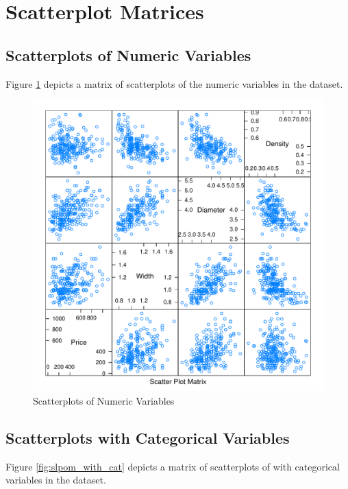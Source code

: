\documentclass[11pt]{book}
\begin{document}
\clearpage
\pagebreak
\section*{Scatterplot Matrices}


\subsection*{Scatterplots of Numeric Variables}

Figure \ref{fig:slpom_num_only} depicts a matrix of scatterplots
of the numeric variables in the dataset.

\begin{figure}[h!]
  \centering
  \includegraphics[scale = 0.5, keepaspectratio=true]{../Figures/slpom_num_only}
  \caption{Scatterplots of Numeric Variables} \label{fig:slpom_num_only}
\end{figure}


\pagebreak
\subsection*{Scatterplots with Categorical Variables}

Figure \ref{fig:slpom_with_cat} depicts a matrix of scatterplots
of with categorical variables in the dataset.
\end{document}
